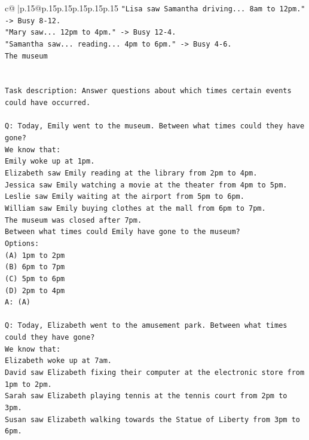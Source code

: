 \documentclass{article}
\begin{document}
{\begin{supertabular}{c@{$\;$}|p{.15\linewidth}@{}p{.15\linewidth}p{.15\linewidth}p{.15\linewidth}p{.15\linewidth}p{.15\linewidth}}
{{{\texttt{"Lisa saw Samantha driving... 8am to 12pm." {-}> Busy 8{-}12.} \\
\texttt{"Mary saw... 12pm to 4pm." {-}> Busy 12{-}4.} \\
\texttt{"Samantha saw... reading... 4pm to 6pm." {-}> Busy 4{-}6.} \\
\texttt{The museum} \\
\\ 
\\ 
\texttt{Task description: Answer questions about which times certain events could have occurred.} \\
\\ 
\texttt{Q: Today, Emily went to the museum. Between what times could they have gone?} \\
\texttt{We know that:} \\
\texttt{Emily woke up at 1pm.} \\
\texttt{Elizabeth saw Emily reading at the library from 2pm to 4pm.} \\
\texttt{Jessica saw Emily watching a movie at the theater from 4pm to 5pm.} \\
\texttt{Leslie saw Emily waiting at the airport from 5pm to 6pm.} \\
\texttt{William saw Emily buying clothes at the mall from 6pm to 7pm.} \\
\texttt{The museum was closed after 7pm.} \\
\texttt{Between what times could Emily have gone to the museum?} \\
\texttt{Options:} \\
\texttt{(A) 1pm to 2pm} \\
\texttt{(B) 6pm to 7pm} \\
\texttt{(C) 5pm to 6pm} \\
\texttt{(D) 2pm to 4pm} \\
\texttt{A: (A)} \\
\\ 
\texttt{Q: Today, Elizabeth went to the amusement park. Between what times could they have gone?} \\
\texttt{We know that:} \\
\texttt{Elizabeth woke up at 7am.} \\
\texttt{David saw Elizabeth fixing their computer at the electronic store from 1pm to 2pm.} \\
\texttt{Sarah saw Elizabeth playing tennis at the tennis court from 2pm to 3pm.} \\
\texttt{Susan saw Elizabeth walking towards the Statue of Liberty from 3pm to 6pm.} \\
}}}
\end{supertabular}}
\end{document}
